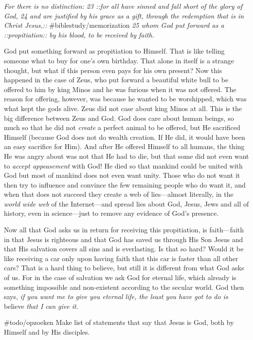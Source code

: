 \emph{For there is no distinction: 23 ::for all have sinned and fall
short of the glory of God, 24 and are justified by his grace as a gift,
through the redemption that is in Christ Jesus,::}
\#biblestudy/memorization \emph{25 whom God put forward as a
::propitiation:: by his blood, to be received by faith.}

God put something forward as propitiation to Himself. That is like
telling someone what to buy for one's own birthday. That alone in itself
is a strange thought, but what if this person even pays for his own
present? Now this happened in the case of Zeus, who put forward a
beautiful white bull to be offered to him by king Minos and he was
furious when it was not offered. The reason for offering, however, was
because he wanted to be worshipped, which was what kept the gods alive.
Zeus did not case about king Minos at all. This is the big difference
between Zeus and God. God does care about human beings, so much so that
he did not \emph{create} a perfect animal to be offered, but He
sacrificed Himself (because God does not do wealth creation. If He did,
it would have been an easy sacrifice for Him). And after He offered
Himself to all humans, the thing He was angry about was not that He had
to die, but that some did not even want to \emph{accept appeasement}
with God! He died so that mankind could be united with God but most of
mankind does not even want unity. Those who do not want it then try to
influence and convince the few remaining people who do want it, and when
that does not succeed they create a web of lies---almost literally, in
the \emph{world wide web} of the Internet---and spread lies about God,
Jesus, Jews and all of history, even in science---just to remove any
evidence of God's presence.

Now all that God asks us in return for receiving this propitiation, is
faith---faith in that Jesus is righteous and that God has saved us
through His Son Jesus and that His salvation covers all sins and is
everlasting. Is that so hard? Would it be like receiving a car only upon
having faith that this car is faster than all other cars? That is a hard
thing to believe, but still it is different from what God asks of us.
For in the case of salvation we ask God for eternal life, which already
is something impossible and non-existent according to the secular world.
God then says, \emph{if you want me to give you eternal life, the least
you have got to do is} believe \emph{that I can give it.}

\#todo/opzoeken Make list of statements that say that Jesus is God, both
by Himself and by His disciples.

